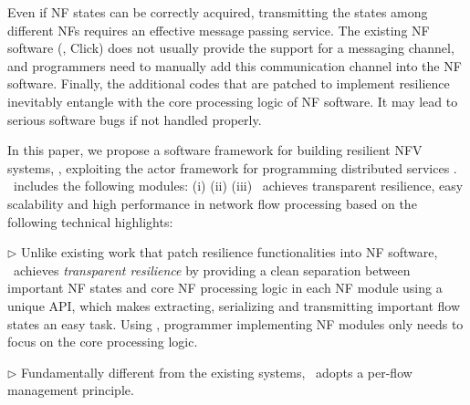 Even if NF states can be correctly acquired, transmitting
the states among different NFs %
 requires an
effective message passing service. The existing NF software (\eg,
Click\cite{kohler2000click}) does not usually provide the support for a messaging channel, and programmers need to manually add this communication
channel into the NF software. Finally, the additional codes that are patched to
implement resilience inevitably entangle with the core processing logic of NF
software. It may lead to serious software bugs if not handled properly.


In this paper, we propose a software framework for building resilient NFV systems, \nfactor, exploiting the actor framework for programming distributed services \cite{actor-wiki, akka, newell2016optimizing}. \nfactor~includes the following modules: (i) (ii) (iii) 
\nfactor~achieves transparent resilience, easy scalability and high performance in network flow processing based on the following technical highlights: 

$\triangleright$  Unlike existing work
\cite{gember2015opennf, sherry2015rollback} that patch resilience
functionalities into NF software, \nfactor~achieves {\em transparent resilience} by providing a clean separation between important NF states and core NF processing logic in each NF module using a unique API, which makes extracting, serializing and transmitting important flow states an easy task. Using \nfactor, programmer implementing NF modules only needs to focus on the core processing logic. 


$\triangleright$ Fundamentally different from the existing systems, \nfactor~adopts a per-flow management principle.  




